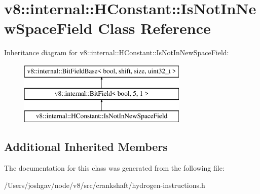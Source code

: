 \hypertarget{classv8_1_1internal_1_1_h_constant_1_1_is_not_in_new_space_field}{}\section{v8\+:\+:internal\+:\+:H\+Constant\+:\+:Is\+Not\+In\+New\+Space\+Field Class Reference}
\label{classv8_1_1internal_1_1_h_constant_1_1_is_not_in_new_space_field}
Inheritance diagram for v8\+:\+:internal\+:\+:H\+Constant\+:\+:Is\+Not\+In\+New\+Space\+Field\+:\begin{figure}[H]
\begin{center}
\leavevmode
\includegraphics[height=3.000000cm]{classv8_1_1internal_1_1_h_constant_1_1_is_not_in_new_space_field}
\end{center}
\end{figure}
\subsection*{Additional Inherited Members}


The documentation for this class was generated from the following file\+:\begin{DoxyCompactItemize}
\item 
/\+Users/joshgav/node/v8/src/crankshaft/hydrogen-\/instructions.\+h\end{DoxyCompactItemize}
